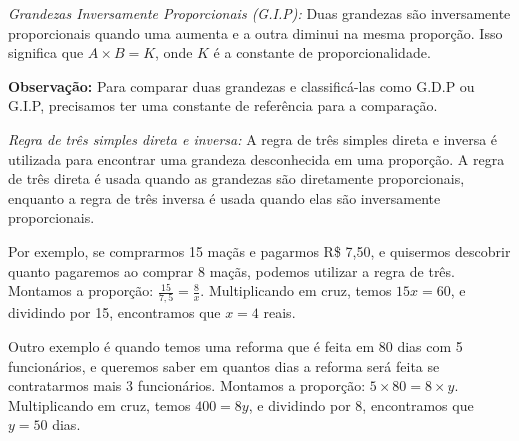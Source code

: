 {\medskip \noindent \textit{Grandezas Inversamente Proporcionais (G.I.P):} Duas grandezas são
 inversamente proporcionais quando uma aumenta e a outra diminui na mesma
 proporção. Isso significa que $A \times B = K$, onde $K$ é a constante de
 proporcionalidade.

\medskip \noindent \textbf{Observação:} Para comparar duas grandezas e classificá-las como G.D.P
 ou G.I.P, precisamos ter uma constante de referência para a comparação.










\medskip \noindent  \textit{Regra de três simples direta e inversa:} A regra
 de três simples direta e inversa é utilizada para encontrar uma grandeza
 desconhecida em uma proporção. A regra de três direta é usada quando as
 grandezas são diretamente proporcionais, enquanto a regra de três inversa é
 usada quando elas são inversamente proporcionais.

Por exemplo, se comprarmos 15 maçãs e pagarmos R\$ 7,50, e quisermos descobrir
quanto pagaremos ao comprar 8 maçãs, podemos utilizar a regra de três.
Montamos a proporção: $\frac{15}{7,5} = \frac{8}{x}$. Multiplicando em cruz,
temos $15x = 60$, e dividindo por 15, encontramos que $x = 4$ reais.

Outro exemplo é quando temos uma reforma que é feita em 80 dias com 5
funcionários, e queremos saber em quantos dias a reforma será feita se
contratarmos mais 3 funcionários. Montamos a proporção: $5 \times 80 =
8 \times y$. Multiplicando em cruz, temos $400 = 8y$, e dividindo por 8,
encontramos que $y = 50$ dias.

}

